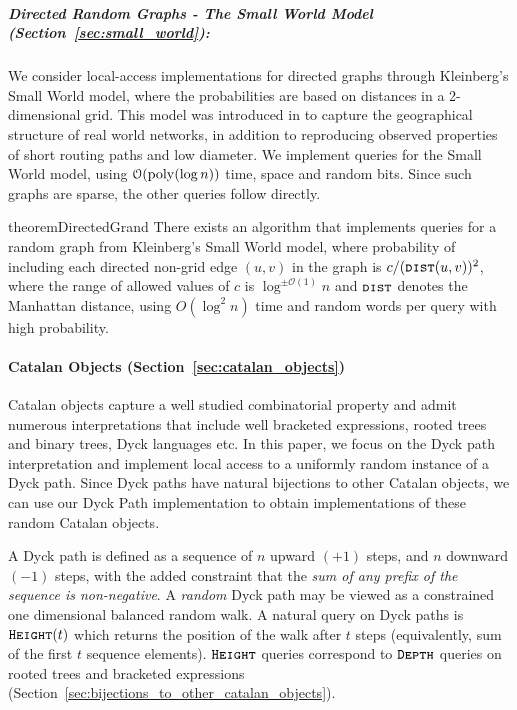 \subparagraph*{Directed Random Graphs - The Small World Model (Section~\ref{sec:small_world}):}
\label{par:directed_random_graphs}
We consider local-access implementations for directed graphs through Kleinberg's Small World model,
where the probabilities are based on distances in a 2-dimensional grid.
This model was introduced in \cite{kleinberg} to capture the geographical structure of real world networks,
in addition to reproducing observed properties of short routing paths and low diameter.
We implement  queries for the Small World model, using $\mathcal{O}(\mathrm{poly}(\log n))$ time, space and random bits.
Since such graphs are sparse, the other queries follow directly.
\begin{restatable}{theorem}{DirectedGrand}\label{DirectedGrand}
There exists an algorithm that implements  queries for a random graph from Kleinberg's Small World model,
where probability of including each directed non-grid edge $(u,v)$ in the graph is $c/(\texttt{\textsc{dist}}(u,v))^2$,
where the range of allowed values of $c$ is $\log^{\pm\mathcal O(1)} n$ and $\texttt{\textsc{dist}}$ denotes the Manhattan distance,
using $O(\log^2 n)$ time and random words per query with high probability.
\end{restatable}





\paragraph*{Catalan Objects (Section~\ref{sec:catalan_objects})}%
\label{par:intro_catalan_objects}
Catalan objects capture a well studied combinatorial property and admit numerous interpretations that include
well bracketed expressions, rooted trees and binary trees, Dyck languages etc.
In this paper, we focus on the Dyck path interpretation and implement local access to a uniformly random instance of a Dyck path.
Since Dyck paths have natural bijections to other Catalan objects,
we can use our Dyck Path implementation to obtain implementations of these random Catalan objects.

A Dyck path is defined as a sequence of $n$ upward $(+1)$ steps, and $n$ downward $(-1)$ steps,
with the added constraint that the \emph{sum of any prefix of the sequence is non-negative}.
A \emph{random} Dyck path may be viewed as a constrained one dimensional balanced random walk.
A natural query on Dyck paths is $\texttt{\textsc{Height}}(t)$ which returns the position of the walk after $t$ steps
(equivalently, sum of the first $t$ sequence elements).
$\texttt{\textsc{Height}}$ queries correspond to $\texttt{\textsc{Depth}}$ queries on rooted trees and bracketed expressions
(Section~\ref{sec:bijections_to_other_catalan_objects}).

